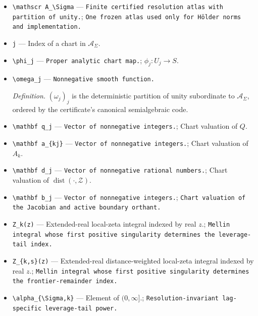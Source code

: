 \documentclass{article}
\begin{document}
\begin{itemize}
  \item \texttt{\textbackslash{}\allowbreak{}mathscr A\_\allowbreak{}\textbackslash{}\allowbreak{}Sigma} --- \texttt{Finite certified resolution atlas with partition of unity.}; \texttt{One frozen atlas used only for Hölder norms and implementation.}
  \item \texttt{j} --- Index of a chart in \(\mathscr A_\Sigma\).
  \item \texttt{\textbackslash{}\allowbreak{}phi\_\allowbreak{}j} --- \texttt{Proper analytic chart map.}; \(\phi_j:U_j\to S\).
  \item \texttt{\textbackslash{}\allowbreak{}omega\_\allowbreak{}j} --- \texttt{Nonnegative smooth function.}
  \par\smallskip\noindent\emph{Definition.} \((\omega_j)_j\) is the deterministic partition of unity subordinate to \(\mathscr A_\Sigma\), ordered by the certificate's canonical semialgebraic code.
  \item \texttt{\textbackslash{}\allowbreak{}mathbf q\_\allowbreak{}j} --- \texttt{Vector of nonnegative integers.}; Chart valuation of \(Q\).
  \item \texttt{\textbackslash{}\allowbreak{}mathbf a\_\allowbreak{}\{kj\}\allowbreak{}} --- \texttt{Vector of nonnegative integers.}; Chart valuation of \(A_k\).
  \item \texttt{\textbackslash{}\allowbreak{}mathbf d\_\allowbreak{}j} --- \texttt{Vector of nonnegative rational numbers.}; Chart valuation of \(\operatorname{dist}(\cdot,\mathcal Z)\).
  \item \texttt{\textbackslash{}\allowbreak{}mathbf b\_\allowbreak{}j} --- \texttt{Vector of nonnegative integers.}; \texttt{Chart valuation of the Jacobian and active boundary orthant.}
  \item \texttt{Z\_\allowbreak{}k(z)} --- Extended-real local-zeta integral indexed by real \(z\).; \texttt{Mellin integral whose first positive singularity determines the leverage-\allowbreak{}tail index.}
  \item \texttt{Z\_\allowbreak{}\{k,\allowbreak{}s\}\allowbreak{}(z)} --- Extended-real distance-weighted local-zeta integral indexed by real \(z\).; \texttt{Mellin integral whose first positive singularity determines the frontier-\allowbreak{}remainder index.}
  \item \texttt{\textbackslash{}\allowbreak{}alpha\_\allowbreak{}\{\textbackslash{}\allowbreak{}Sigma,\allowbreak{}k\}\allowbreak{}} --- Element of \( (0,\infty]\).; \texttt{Resolution-\allowbreak{}invariant lag-\allowbreak{}specific leverage-\allowbreak{}tail power.}

\end{itemize}
\end{document}
